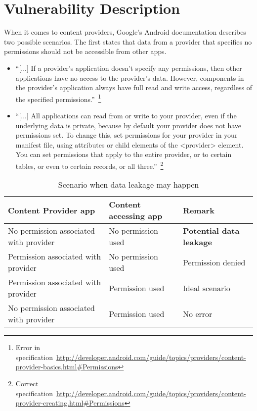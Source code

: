 \section{Vulnerability Description}
\label{vuln}
\noindent
When it comes to content providers, Google's Android documentation describes two possible scenarios. The first states that data from a provider that specifies no permissions should not be accessible from other apps.
\begin{itemize}
 \item ``[...] If a provider's application doesn't specify any permissions, then other applications have no access to the provider's data. However, components in the provider's application always have full read and write access, regardless of the specified permissions.''~\footnote{Error in specification~\url{http://developer.android.com/guide/topics/providers/content-provider-basics.html#Permissions}}
 \item ``[...] All applications can read from or write to your provider, even if the underlying data is private, because by default your provider does not have permissions set. To change this, set permissions for your provider in your manifest file, using attributes or child elements of the <provider> element. You can set permissions that apply to the entire provider, or to certain tables, or even to certain records, or all three.''~\footnote{Correct specification~\url{http://developer.android.com/guide/topics/providers/content-provider-creating.html#Permissions}}
\end{itemize}
\begin{center}
	\begin{table}
		\label{tableErrors}
		\begin{tabular}{ | p{2.5cm} | p{2.5cm} | p{2cm} | }
			\hline
			\textbf{Content Provider app} & \textbf{Content accessing app} & \textbf{Remark} \\
			\hline \hline
			No permission associated with provider & No permission used & \textcolor[rgb]{1,0,0}{\textbf{Potential data leakage}} \\
			\hline
			Permission associated with provider & No permission used & Permission denied \\
			\hline
			Permission associated with provider & Permission used & Ideal scenario \\
			\hline
			No permission associated with provider & Permission used & No error \\
			\hline
		\end{tabular}
		\caption{Scenario when data leakage may happen}
	\end{table}
\end{center}
